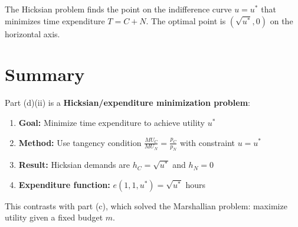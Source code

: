 \documentclass[11pt]{article}
\begin{document}
\begin{center}
\end{center}

The Hicksian problem finds the point on the indifference curve $u = u^*$ that minimizes time expenditure $T = C + N$. The optimal point is $(\sqrt{u^*}, 0)$ on the horizontal axis.

\section{Summary}

Part (d)(ii) is a \textbf{Hicksian/expenditure minimization problem}:
\begin{enumerate}
    \item \textbf{Goal:} Minimize time expenditure to achieve utility $u^*$
    \item \textbf{Method:} Use tangency condition $\frac{MU_C}{MU_N} = \frac{p_C}{p_N}$ with constraint $u = u^*$
    \item \textbf{Result:} Hicksian demands are $h_C = \sqrt{u^*}$ and $h_N = 0$
    \item \textbf{Expenditure function:} $e(1, 1, u^*) = \sqrt{u^*}$ hours
\end{enumerate}

This contrasts with part (c), which solved the Marshallian problem: maximize utility given a fixed budget $m$.
\end{document}

